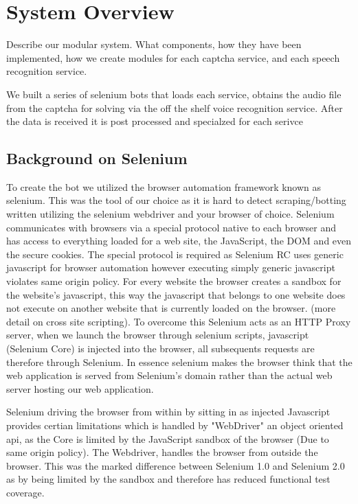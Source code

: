 \section{System Overview}
\label{sec:system}

Describe our modular system. What components, how they have been implemented, how we create modules for each captcha service, and each speech recognition service.


We built a series of selenium bots that loads each service, obtains the audio file from the captcha for solving via the off the shelf voice recognition service. After the data is received it is post processed and specialzed for each serivce 


\subsection{Background on Selenium} 

To create the bot we utilized the browser automation framework known as selenium. This was the tool of our choice as it is hard to detect scraping/botting written utilizing the selenium webdriver and your browser of choice. Selenium communicates with browsers via a special protocol native to each browser and has access to everything loaded for a web site, the JavaScript, the DOM and even the secure cookies. The special protocol is required as  Selenium RC uses generic javascript for browser automation however executing simply generic javascript violates same origin policy. For every website the browser creates a sandbox for the website's javascript, this way the javascript that belongs to one website does not execute on another website that is currently loaded on the browser. (more detail on cross site scripting). To overcome this Selenium acts as an HTTP Proxy server, when we launch the browser through selenium scripts, javascript (Selenium Core) is injected into the browser, all subsequents requests are therefore through Selenium. In essence selenium makes the browser think that the web application is served from Selenium's domain rather than the actual web server hosting our web application.   

Selenium driving the browser from within by sitting in as injected Javascript provides certian limitations which is handled by "WebDriver" an object oriented api, as the Core is limited by the JavaScript sandbox of the browser (Due to same origin policy). The Webdriver, handles the browser from outside the browser. This was the marked difference between Selenium 1.0 and Selenium 2.0 as by being limited by the sandbox and therefore has reduced functional test coverage. 



